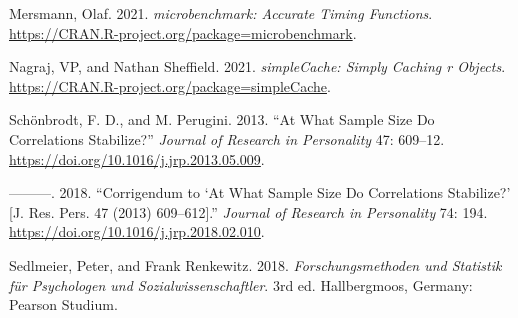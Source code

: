 \begin{CSLReferences}{1}{0}
\leavevmode{}%
Mersmann, Olaf. 2021. \emph{{microbenchmark}: Accurate Timing Functions}. \url{https://CRAN.R-project.org/package=microbenchmark}.

\leavevmode{}%
Nagraj, VP, and Nathan Sheffield. 2021. \emph{simpleCache: Simply Caching r Objects}. \url{https://CRAN.R-project.org/package=simpleCache}.

\leavevmode{}%
Schönbrodt, F. D., and M. Perugini. 2013. {``At What Sample Size Do Correlations Stabilize?''} \emph{Journal of Research in Personality} 47: 609--12. \url{https://doi.org/10.1016/j.jrp.2013.05.009}.

\leavevmode{}%
---------. 2018. {``Corrigendum to {`{At What Sample Size Do Correlations Stabilize}?'} {[}{J}. {Res}. {Pers}. 47 (2013) 609--612{]}.''} \emph{Journal of Research in Personality} 74: 194. \url{https://doi.org/10.1016/j.jrp.2018.02.010}.

\leavevmode{}%
Sedlmeier, Peter, and Frank Renkewitz. 2018. \emph{Forschungsmethoden und Statistik für Psychologen und Sozialwissenschaftler}. 3rd ed. {Hallbergmoos, Germany}: {Pearson Studium}.

\end{CSLReferences}



\address{%
Johannes Titz\\
Chemnitz University of Technology\\%
Department of Psychology\\ Chemnitz, Germany\\
%
\url{https://johannestitz.com}\\%
\textit{ORCiD: \href{https://orcid.org/0000-0002-1102-5719}{0000-0002-1102-5719}}\\%
\href{mailto:johannes.titz@psychologie.tu-chemnitz.de}{\nolinkurl{johannes.titz@psychologie.tu-chemnitz.de}}%
}
